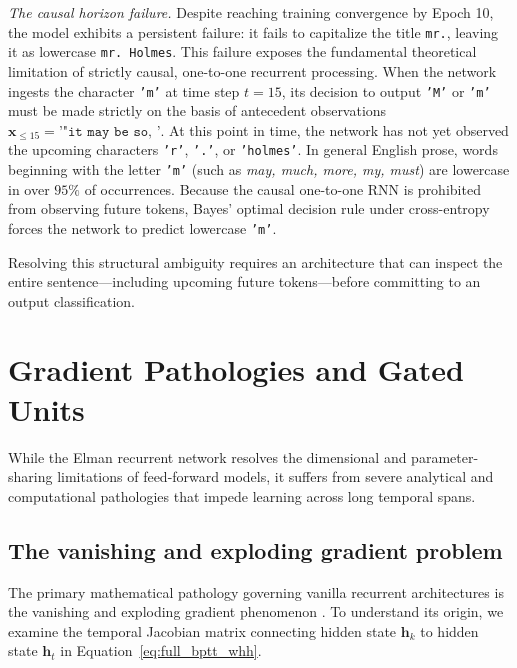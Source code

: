 \documentclass[../../../main.tex]{subfiles}
\begin{document}
\textit{The causal horizon failure.} Despite reaching training convergence by Epoch 10, the model exhibits a persistent failure: it fails to capitalize the title \texttt{mr.}, leaving it as lowercase \texttt{mr. Holmes}. This failure exposes the fundamental theoretical limitation of strictly causal, one-to-one recurrent processing. When the network ingests the character \texttt{'m'} at time step $t=15$, its decision to output \texttt{'M'} or \texttt{'m'} must be made strictly on the basis of antecedent observations $\mathbf{x}_{\le 15} = \texttt{'"it may be so, '}$. At this point in time, the network has not yet observed the upcoming characters \texttt{'r'}, \texttt{'.'}, or \texttt{'holmes'}. In general English prose, words beginning with the letter \texttt{'m'} (such as \textit{may, much, more, my, must}) are lowercase in over $95\%$ of occurrences. Because the causal one-to-one RNN is prohibited from observing future tokens, Bayes' optimal decision rule under cross-entropy forces the network to predict lowercase \texttt{'m'}.

Resolving this structural ambiguity requires an architecture that can inspect the entire sentence—including upcoming future tokens—before committing to an output classification.

\clearpage
\section{Gradient Pathologies and Gated Units}
\label{sec:rnn_pathologies_gated}

While the Elman recurrent network resolves the dimensional and parameter-sharing limitations of feed-forward models, it suffers from severe analytical and computational pathologies that impede learning across long temporal spans.

\subsection{The vanishing and exploding gradient problem}
\label{subsec:rnn_vanishing_exploding_gradients}

The primary mathematical pathology governing vanilla recurrent architectures is the vanishing and exploding gradient phenomenon \citep{bengio1994,pascanu2013difficulty}. To understand its origin, we examine the temporal Jacobian matrix connecting hidden state $\mathbf{h}_k$ to hidden state $\mathbf{h}_t$ in Equation~\ref{eq:full_bptt_whh}.
\end{document}
